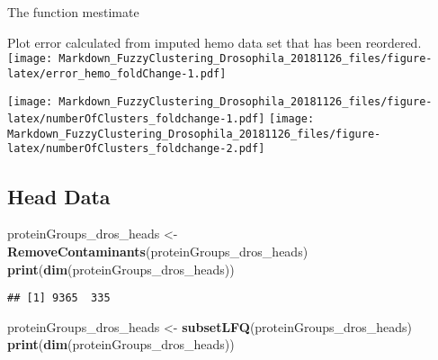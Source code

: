 \documentclass[]{article}
\newenvironment{Shaded}{\begin{snugshade}}{\end{snugshade}}
\newcommand{\KeywordTok}[1]{\textcolor[rgb]{0.13,0.29,0.53}{\textbf{#1}}}
\newcommand{\DataTypeTok}[1]{\textcolor[rgb]{0.13,0.29,0.53}{#1}}
\newcommand{\DecValTok}[1]{\textcolor[rgb]{0.00,0.00,0.81}{#1}}
\newcommand{\StringTok}[1]{\textcolor[rgb]{0.31,0.60,0.02}{#1}}
\newcommand{\CommentTok}[1]{\textcolor[rgb]{0.56,0.35,0.01}{\textit{#1}}}
\newcommand{\ControlFlowTok}[1]{\textcolor[rgb]{0.13,0.29,0.53}{\textbf{#1}}}
\newcommand{\OperatorTok}[1]{\textcolor[rgb]{0.81,0.36,0.00}{\textbf{#1}}}
\newcommand{\NormalTok}[1]{#1}
\begin{document}
The function mestimate

\begin{Shaded}
\end{Shaded}

Plot error calculated from imputed hemo data set that has been
reordered.
\texttt{[image: Markdown\_FuzzyClustering\_Drosophila\_20181126\_files/figure-latex/error\_hemo\_foldChange-1.pdf]}

\texttt{[image: Markdown\_FuzzyClustering\_Drosophila\_20181126\_files/figure-latex/numberOfClusters\_foldchange-1.pdf]}
\texttt{[image: Markdown\_FuzzyClustering\_Drosophila\_20181126\_files/figure-latex/numberOfClusters\_foldchange-2.pdf]}

\subsection{Head Data}\label{head-data}

\begin{Shaded}
\begin{Highlighting}[]
\NormalTok{proteinGroups_dros_heads <-}\StringTok{ }\KeywordTok{RemoveContaminants}\NormalTok{(proteinGroups_dros_heads)}
\KeywordTok{print}\NormalTok{(}\KeywordTok{dim}\NormalTok{(proteinGroups_dros_heads))}
\end{Highlighting}
\end{Shaded}

\begin{verbatim}
## [1] 9365  335
\end{verbatim}

\begin{Shaded}
\begin{Highlighting}[]
\NormalTok{proteinGroups_dros_heads <-}\StringTok{ }\KeywordTok{subsetLFQ}\NormalTok{(proteinGroups_dros_heads) }
\KeywordTok{print}\NormalTok{(}\KeywordTok{dim}\NormalTok{(proteinGroups_dros_heads))}
\end{Highlighting}
\end{Shaded}
\end{document}
